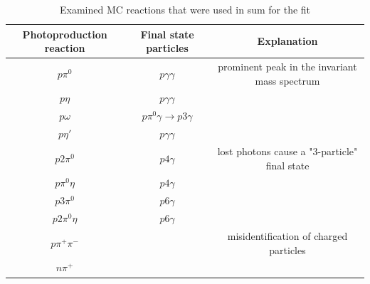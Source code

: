 	\begin{table}[htbp]
		\begin{tabular}{ccc}
			\toprule
			Photoproduction reaction &Final state particles&Explanation\\
			\hline
			$p\pi^0$ & $p\gamma\gamma$&prominent peak in the invariant mass spectrum \\
			$p\eta$ & $p\gamma\gamma$& \\
			$p\omega$ & $p\pi^0\gamma\to p3\gamma$& \\
			$p\eta'$ & $p\gamma\gamma$&\\
			$p2\pi^0$ & $p4\gamma$&lost photons cause a "3-particle" final state\\
			$p\pi^0\eta$ & $p4\gamma$&\\
			$p3\pi^0$ & $p6\gamma$&\\
			$p2\pi^0\eta$ & $p6\gamma$&\\
			$p\pi^+\pi^-$ &&misidentification of charged particles\\
			$n\pi^+$ &&\\
			\bottomrule
		\end{tabular}
	\caption{Examined MC reactions that were used in sum for the fit}
	\label{tab:mc}
	\end{table}
	
